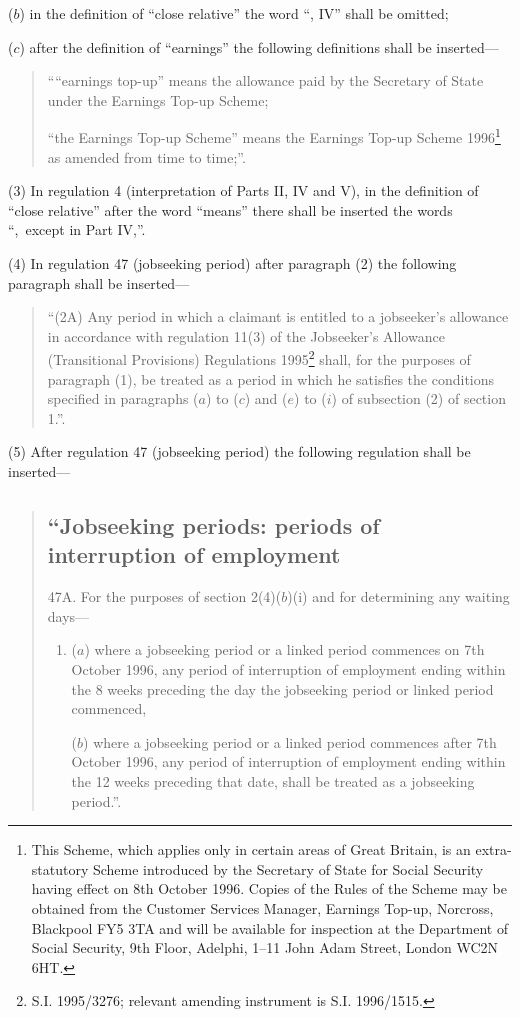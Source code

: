 \documentclass[a4paper]{article}
\begin{document}
\begin{enumerate}
($b$) in the definition of “close relative” the word “, IV” shall be omitted;

($c$) after the definition of “earnings” the following definitions shall be inserted—
\begin{quotation}
““earnings top-up” means the allowance paid by the Secretary of State under the Earnings Top-up Scheme;

“the Earnings Top-up Scheme” means the Earnings Top-up Scheme 1996\footnote{\frenchspacing This Scheme, which applies only in certain areas of Great Britain, is an extra-statutory Scheme introduced by the Secretary of State for Social Security having effect on 8th October 1996. Copies of the Rules of the Scheme may be obtained from the Customer Services Manager, Earnings Top-up, Norcross, Blackpool FY5 3TA and will be available for inspection at the Department of Social Security, 9th Floor, Adelphi, 1--11 John Adam Street, London WC2N 6HT.} as amended from time to time;”.
\end{quotation}
\end{enumerate}

(3) In regulation 4 (interpretation of Parts II, IV and V), in the definition of “close relative” after the word “means” there shall be inserted the words “,~except in Part IV,”.

(4) In regulation 47 (jobseeking period) after paragraph (2) the following paragraph shall be inserted—
\begin{quotation}
“(2A) Any period in which a claimant is entitled to a jobseeker’s allowance in accordance with regulation 11(3) of the Jobseeker’s Allowance (Transitional Provisions) Regulations 1995\footnote{\frenchspacing S.I. 1995/3276; relevant amending instrument is S.I. 1996/1515.} shall, for the purposes of paragraph (1), be treated as a period in which he satisfies the conditions specified in paragraphs ($a$) to ($c$) and ($e$) to ($i$) of subsection (2) of section 1.”.
\end{quotation}

(5) After regulation 47 (jobseeking period) the following regulation shall be inserted—
\begin{quotation}
\subsection*{“Jobseeking periods: periods of interruption of employment}

47A.  For the purposes of section 2(4)($b$)(i) and for determining any waiting days—
\begin{enumerate}\item[]
($a$) where a jobseeking period or a linked period commences on 7th October 1996, any period of interruption of employment ending within the 8 weeks preceding the day the jobseeking period or linked period commenced,

($b$) where a jobseeking period or a linked period commences after 7th October 1996, any period of interruption of employment ending within the 12 weeks preceding that date,
shall be treated as a jobseeking period.”.
\end{enumerate}
\end{quotation}
\end{document}
